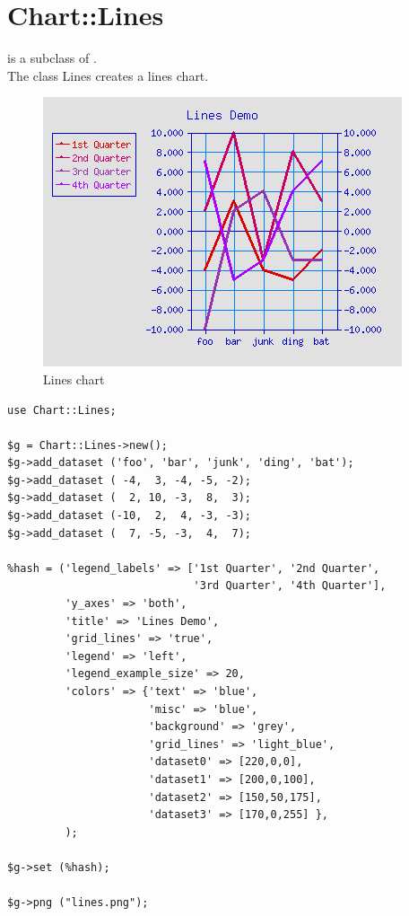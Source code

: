 %
%
\section{Chart::Lines}
\begin{Description}
 is a subclass of .\\
The class Lines creates a lines chart.
\end{Description}



\begin{figure}[h]
	\begin{center}
		\includegraphics[scale=0.5]{d_lines2.png}
	\end{center}
	\caption{Lines chart}
	\label{fig:lines}
\end{figure}
\begin{verbatim}
use Chart::Lines;

$g = Chart::Lines->new();
$g->add_dataset ('foo', 'bar', 'junk', 'ding', 'bat');
$g->add_dataset ( -4,  3, -4, -5, -2);
$g->add_dataset (  2, 10, -3,  8,  3);
$g->add_dataset (-10,  2,  4, -3, -3);
$g->add_dataset (  7, -5, -3,  4,  7);

%hash = ('legend_labels' => ['1st Quarter', '2nd Quarter',
                             '3rd Quarter', '4th Quarter'],
         'y_axes' => 'both',
         'title' => 'Lines Demo',
         'grid_lines' => 'true',
         'legend' => 'left',
         'legend_example_size' => 20,
         'colors' => {'text' => 'blue',
                      'misc' => 'blue',
                      'background' => 'grey',
                      'grid_lines' => 'light_blue',
                      'dataset0' => [220,0,0],
                      'dataset1' => [200,0,100],
                      'dataset2' => [150,50,175],
                      'dataset3' => [170,0,255] },
         );

$g->set (%hash);

$g->png ("lines.png");
\end{verbatim}

